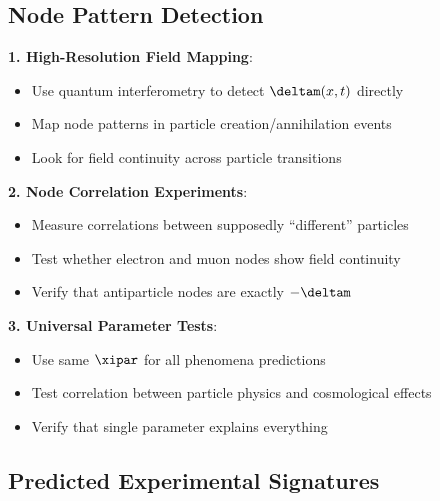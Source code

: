 	\subsection{Node Pattern Detection}
	
	\textbf{1. High-Resolution Field Mapping}:
	\begin{itemize}
		\item Use quantum interferometry to detect $\deltam(x,t)$ directly
		\item Map node patterns in particle creation/annihilation events
		\item Look for field continuity across particle transitions
	\end{itemize}
	
	\textbf{2. Node Correlation Experiments}:
	\begin{itemize}
		\item Measure correlations between supposedly ``different'' particles
		\item Test whether electron and muon nodes show field continuity
		\item Verify that antiparticle nodes are exactly $-\deltam$
	\end{itemize}
	
	\textbf{3. Universal Parameter Tests}:
	\begin{itemize}
		\item Use same $\xipar$ for all phenomena predictions
		\item Test correlation between particle physics and cosmological effects
		\item Verify that single parameter explains everything
	\end{itemize}
	
	\subsection{Predicted Experimental Signatures}
	
	\begin{table}[htbp]
		\centering
		\caption{Predicted experimental signatures of node theory}
		\label{tab:experimental_signatures}
	\end{table}
	
